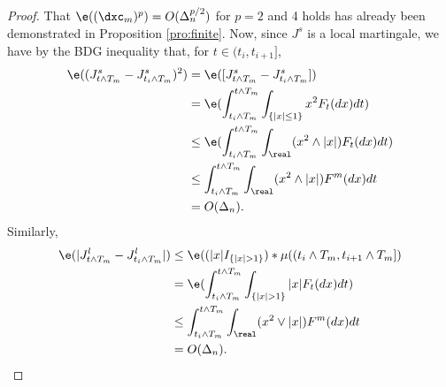 \begin{proof}
That $\e((\dxc_m)^p) = O(\Delta_n^{p/2})$  for $p = 2$ and 4  holds has already been demonstrated in Proposition \ref{pro:finite}. Now, since $J^s$ is a local martingale, we have by  the BDG inequality that,   for $t \in (t_i, t_{i + 1}]$, 
\begin{align}
\e( ( J^s_{t\wedge T_m} - J^s_{t_{i}\wedge T_m})^2) &= \e(  [J^s_{t\wedge T_m} - J^s_{t_{i}\wedge T_m}]) \notag \\
& = \e(\int_{t_i \wedge T_m}^{t\wedge T_m}\int_{\{ \vert x \vert \le 1\}} x^2 F_t(dx) dt)\notag \\
& \le \e(\int_{t_i\wedge T_m}^{t\wedge T_m}\int_\real (x^2 \wedge \vert x \vert ) F_t(dx) dt)\notag \\
& \le  \int_{t_i\wedge T_m}^{t\wedge T_m}\int_\real (x^2 \wedge \vert x \vert) F^m(dx) dt\notag\\
& =  O(\Delta_n)\notag.
\end{align}
Similarly, 
\begin{align}
\e( \vert J^l_{t\wedge T_m} - J^l_{t_{i}\wedge T_m} \vert) &\le \e( (\vert x\vert I_{\{\vert x \vert > 1\}}) \ast \mu((t_i\wedge T_m, t_{i+1}\wedge T_m] ) \notag\\
& = \e(\int_{t_i\wedge T_m}^{t\wedge T_m}\int_{\{ \vert x \vert > 1\}} \vert x\vert F_t(dx) dt)\notag \\
& \le  \int_{t_i\wedge T_m}^{t\wedge T_m}\int_\real (x^2 \vee \vert x \vert) F^m(dx) dt\notag\\
& =  O(\Delta_n)\notag.
  \label{}
\end{align}
\end{proof}
\begin{comment}
First, we state some obvious results.
\begin{lem}
 Let the price process  $X$ be specified as in  \eqref{eq:semimartingale}. Then,
 \begin{enumerate}
   \item $(x^2 \wedge 1) \ast \mu$ is locally integrable.
   \item $(\vert x \vert I_{\{\vert x \vert > 1\}}) \ast \mu$ is locally integrable.
 \end{enumerate}
\end{lem}
The first statement follows because $(x^2 \wedge 1) \ast \mu_t$ is dominated by $ (x^2I_{\{\vert x \vert \le 1\}}) \ast \mu_t$ and $ (I_{\{\vert x \vert > 1\}}) \ast \mu_t$, which  are increasing processes with bounded jumps and, therefore, locally integrable.    
\end{comment}
